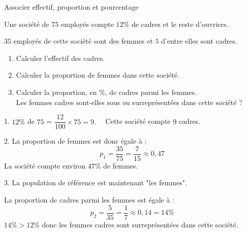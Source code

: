 \begin{methode}{Associer effectif, proportion et pourcentage}

	Une société de $75$ employés compte $12\%$ de cadres et le reste d'ouvriers.

	$35$ employés de cette société sont des femmes et $5$ d'entre elles sont cadres.

	\begin{enumerate}
		\item Calculer l'effectif des cadres.
		\item Calculer la proportion de femmes dans cette société.
		\item Calculer la proportion, en \%, de cadres parmi les femmes.\\Les femmes cadres sont-elles sous ou surreprésentées dans cette société ?
	\end{enumerate}

	\begin{correction}

		1. $12 \%$ de $75$ = $\dfrac{12}{100} \times 75 = 9.\quad$ Cette société compte $9$ cadres.

		2. La proportion de femmes est donc égale à :
		$$p_{1} = \dfrac{35}{75}= \dfrac{7}{15} \approx 0,47$$
		La société compte environ $47 \%$ de femmes.

		3. La population de référence est maintenant "les femmes".

		La proportion de cadres parmi les femmes est égale à :
		$$p_{2} =\dfrac{5}{35} = \dfrac{1}{7} \approx 0,14 = 14\%$$
		$14\% > 12\%$ donc les femmes cadres sont surreprésentées dans cette société.
	\end{correction}
\end{methode}

